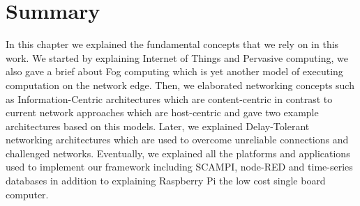 \section{Summary}

In this chapter we explained the fundamental concepts that we rely on in this work. We started by explaining Internet of Things and Pervasive computing, we also gave a brief about Fog computing which is yet  another model of executing computation on the network edge. Then, we elaborated networking concepts such as Information-Centric architectures which are content-centric in contrast to current network approaches which are  host-centric and gave two example architectures based on this models. Later, we explained Delay-Tolerant networking architectures which are used to overcome unreliable connections and challenged networks. Eventually, we explained all the platforms and applications used to implement our framework including SCAMPI, node-RED and time-series databases in addition to explaining Raspberry Pi the low cost single board computer.